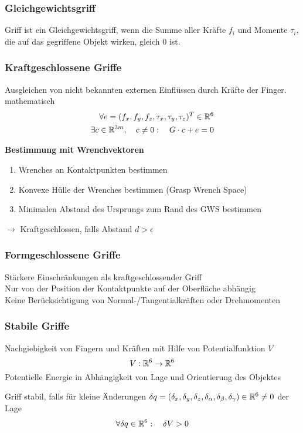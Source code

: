 \subsubsection{Gleichgewichtsgriff}
Griff ist ein Gleichgewichtsgriff, wenn die Summe aller Kräfte \(f_i\) und Momente \(\tau_i\), die auf das gegriffene
Objekt wirken, gleich \(0\) ist.

\subsubsection{Kraftgeschlossene Griffe}
Ausgleichen von nicht bekannten externen Einflüssen durch Kräfte der Finger.\\
mathematisch
\begin{align*}
  \forall e = (f_x, f_y, f_z, \tau_x, \tau_y, \tau_z)^T \in \mathbb{R}^6 \\
  \exists c \in \mathbb{R}^{3m}, \quad c \neq 0: \quad G \cdot c + e = 0
\end{align*}

\textbf{Bestimmung mit Wrenchvektoren}
\begin{enumerate}
\item Wrenches an Kontaktpunkten bestimmen
\item Konvexe Hülle der Wrenches bestimmen (Grasp Wrench Space)
\item Minimalen Abstand des Ursprungs zum Rand des GWS bestimmen
\end{enumerate}
\(\rightarrow\) Kraftgeschlossen, falls Abstand \(d > \epsilon\)

\subsubsection{Formgeschlossene Griffe}
Stärkere Einschränkungen als kraftgeschlossender Griff\\
Nur von der Position der Kontaktpunkte auf der Oberfläche abhängig\\
Keine Berücksichtigung von Normal-/Tangentialkräften oder Drehmomenten

\subsubsection{Stabile Griffe}
Nachgiebigkeit von Fingern und Kräften mit Hilfe von Potentialfunktion \(V\)
\[V : \mathbb{R}^6 \rightarrow \mathbb{R}^6\]
Potentielle Energie in Abhängigkeit von Lage und Orientierung des Objektes

Griff stabil, falls für kleine Änderungen \(\delta q = (\delta_x, \delta_y, \delta_z, \delta_\alpha,\delta_\beta, \delta_\gamma) \in
\mathbb{R}^6 \neq 0\) der Lage
\[\forall \delta q \in \mathbb{R}^6: \quad \delta V > 0\]



